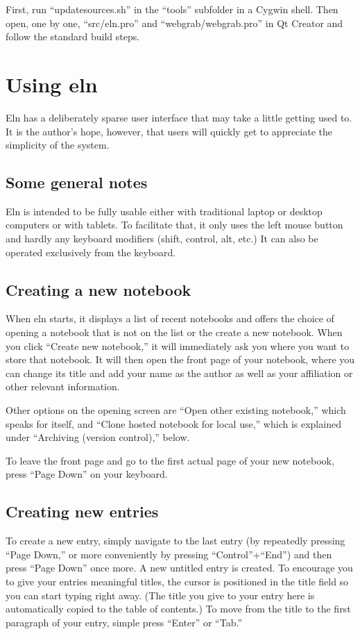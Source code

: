 \documentclass[11pt]{report}
\begin{document}
First, run ``updatesources.sh'' in the
``tools'' subfolder in a Cygwin shell. Then open, one by one, ``src/eln.pro''
and ``webgrab/webgrab.pro'' in Qt
Creator and follow the standard build steps.

\chapter{Using eln}

Eln has a deliberately sparse user interface that may take a little
getting used to. It is the author's hope, however, that users will
quickly get to appreciate the simplicity of the system.

\section{Some general notes}

Eln is intended to be fully usable either with traditional laptop or
desktop computers or with tablets. To facilitate that, it only uses
the left mouse button and hardly any keyboard modifiers (shift,
control, alt, etc.) It can also be operated exclusively from the
keyboard.

\section{Creating a new notebook}

When eln starts, it displays a list of recent notebooks and offers the
choice of opening a notebook that is not on the list or the create a
new notebook. When you click ``Create new notebook,'' it will
immediately ask you where you want to store that notebook. It will
then open the front page of your notebook, where you can change its
title and add your name as the author as well as your affiliation or
other relevant information. 

Other options on the opening screen are ``Open other existing
notebook,'' which speaks for itself, and ``Clone hosted notebook for
local use,'' which is explained under ``Archiving (version control),''
below.


To leave the front page and go to the first actual page of your new
notebook, press ``Page Down'' on your keyboard.

\section{Creating new entries}

To create a new entry, simply navigate to the last entry (by
repeatedly pressing ``Page Down,'' or more conveniently by pressing
``Control''+``End'') and then press ``Page Down'' once more. A new
untitled entry is created. To encourage you to give your entries
meaningful titles, the cursor is positioned in the title field so you
can start typing right away. (The title you give to your entry here is
automatically copied to the table of contents.) To move from the title
to the first paragraph of your entry, simple press ``Enter'' or ``Tab.''
\end{document}
